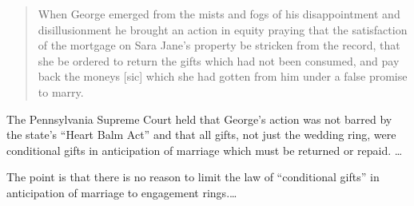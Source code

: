 \begin{quote}
When George emerged from the mists and fogs of his disappointment and
disillusionment he brought an action in equity praying that the satisfaction of
the mortgage on Sara Jane's property be stricken from the record, that she be
ordered to return the gifts which had not been consumed, and pay back the
moneys [sic] which she had gotten from him under a false promise to marry.
\end{quote}

The Pennsylvania Supreme Court held that George's action was not barred by the
state's ``Heart Balm Act'' and that all gifts, not just the wedding ring, were
conditional gifts in anticipation of marriage which must be returned or repaid.
\dots

The point is that there is no reason to limit the law of ``conditional gifts''
in anticipation of marriage to engagement rings.\dots

